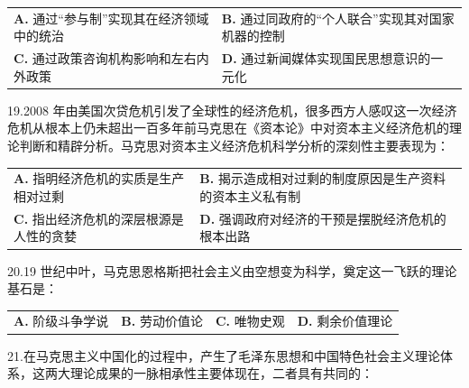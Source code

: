 \documentclass[UTF8,11pt]{ctexart}
\begin{document}
\begin{center}\begin{tabular}{>{\raggedright\arraybackslash}p{\dimexpr(\linewidth-4\tabcolsep)/2\relax}>{\raggedright\arraybackslash}p{\dimexpr(\linewidth-4\tabcolsep)/2\relax}}
\textbf{A.} 通过“参与制”实现其在经济领域中的统治 & \textbf{B.} 通过同政府的“个人联合”实现其对国家机器的控制\\[.35em]
\textbf{C.} 通过政策咨询机构影响和左右内外政策 & \textbf{D.} 通过新闻媒体实现国民思想意识的一元化\\[.35em]\end{tabular}\end{center}

19.2008 年由美国次贷危机引发了全球性的经济危机，很多西方人感叹这一次经济危机从根本上仍未超出一百多年前马克思在《资本论》中对资本主义经济危机的理论判断和精辟分析。马克思对资本主义经济危机科学分析的深刻性主要表现为：


\begin{center}\begin{tabular}{>{\raggedright\arraybackslash}p{\dimexpr(\linewidth-4\tabcolsep)/2\relax}>{\raggedright\arraybackslash}p{\dimexpr(\linewidth-4\tabcolsep)/2\relax}}
\textbf{A.} 指明经济危机的实质是生产相对过剩 & \textbf{B.} 揭示造成相对过剩的制度原因是生产资料的资本主义私有制\\[.35em]
\textbf{C.} 指出经济危机的深层根源是人性的贪婪 & \textbf{D.} 强调政府对经济的干预是摆脱经济危机的根本出路\\[.35em]\end{tabular}\end{center}

20.19 世纪中叶，马克思恩格斯把社会主义由空想变为科学，奠定这一飞跃的理论基石是：


\begin{center}\begin{tabular}{>{\raggedright\arraybackslash}p{\dimexpr(\linewidth-8\tabcolsep)/4\relax}>{\raggedright\arraybackslash}p{\dimexpr(\linewidth-8\tabcolsep)/4\relax}>{\raggedright\arraybackslash}p{\dimexpr(\linewidth-8\tabcolsep)/4\relax}>{\raggedright\arraybackslash}p{\dimexpr(\linewidth-8\tabcolsep)/4\relax}}
\textbf{A.} 阶级斗争学说 & \textbf{B.} 劳动价值论 & \textbf{C.} 唯物史观 & \textbf{D.} 剩余价值理论\\[.35em]\end{tabular}\end{center}

21.在马克思主义中国化的过程中，产生了毛泽东思想和中国特色社会主义理论体系，这两大理论成果的一脉相承性主要体现在，二者具有共同的：
\end{document}
